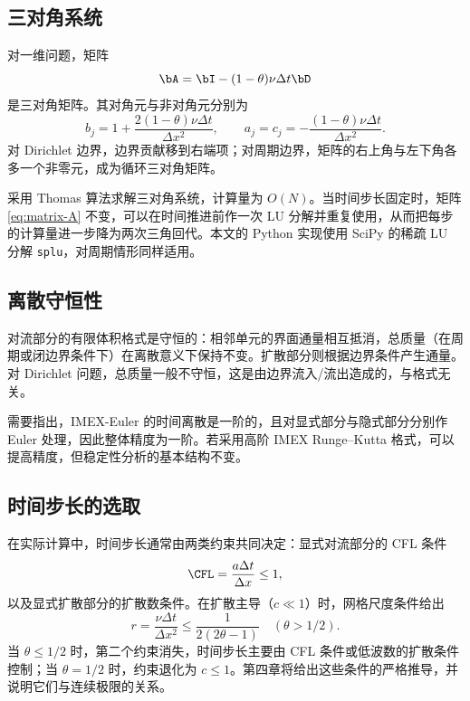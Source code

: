 \subsection{三对角系统}

对一维问题，矩阵
\begin{equation}
  \bA=\bI-(1-\theta)\nu\Delta t\bD
  \label{eq:matrix-A}
\end{equation}
是三对角矩阵。其对角元与非对角元分别为
\begin{equation}
  b_j=1+\frac{2(1-\theta)\nu\Delta t}{\Delta x^2},\qquad
  a_j=c_j=-\frac{(1-\theta)\nu\Delta t}{\Delta x^2}.
  \label{eq:tridiag-coeffs}
\end{equation}
对 Dirichlet 边界，边界贡献移到右端项；对周期边界，矩阵的右上角与左下角各多一个非零元，成为循环三对角矩阵。

采用 Thomas 算法求解三对角系统，计算量为 $O(N)$。当时间步长固定时，矩阵 \eqref{eq:matrix-A} 不变，可以在时间推进前作一次 LU 分解并重复使用，从而把每步的计算量进一步降为两次三角回代。本文的 Python 实现使用 SciPy 的稀疏 LU 分解 \texttt{splu}，对周期情形同样适用。

\subsection{离散守恒性}

对流部分的有限体积格式是守恒的：相邻单元的界面通量相互抵消，总质量（在周期或闭边界条件下）在离散意义下保持不变。扩散部分则根据边界条件产生通量。对 Dirichlet 问题，总质量一般不守恒，这是由边界流入/流出造成的，与格式无关。

需要指出，IMEX-Euler 的时间离散是一阶的，且对显式部分与隐式部分分别作 Euler 处理，因此整体精度为一阶。若采用高阶 IMEX Runge--Kutta 格式，可以提高精度，但稳定性分析的基本结构不变。

\subsection{时间步长的选取}

在实际计算中，时间步长通常由两类约束共同决定：显式对流部分的 CFL 条件
\begin{equation}
  \CFL=\frac{a\Delta t}{\Delta x}\le1,
  \label{eq:cfl}
\end{equation}
以及显式扩散部分的扩散数条件。在扩散主导（$c\ll1$）时，网格尺度条件给出
\begin{equation}
  r=\frac{\nu\Delta t}{\Delta x^2}\le\frac{1}{2(2\theta-1)}\quad(\theta>1/2).
  \label{eq:diffusion-number}
\end{equation}
当 $\theta\le1/2$ 时，第二个约束消失，时间步长主要由 CFL 条件或低波数的扩散条件控制；当 $\theta=1/2$ 时，约束退化为 $c\le1$。第四章将给出这些条件的严格推导，并说明它们与连续极限的关系。

